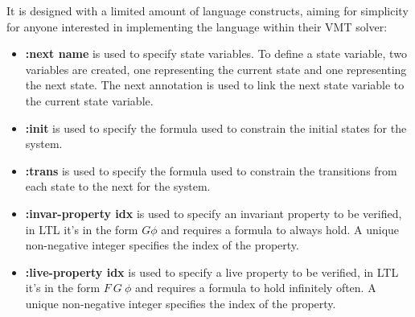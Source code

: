 It is designed with a limited amount of language constructs, aiming for simplicity for anyone interested in implementing the language within their VMT solver:
\begin{itemize}[noitemsep]
    \item \textbf{:next name} is used to specify state variables. To define a state variable, two variables are created, one representing the current state and one representing the next state. The next annotation is used to link the next state variable to the current state variable.
    \item \textbf{:init} is used to specify the formula used to constrain the initial states for the system.
    \item \textbf{:trans} is used to specify the formula used to constrain the transitions from each state to the next for the system.
    \item \textbf{:invar-property idx} is used to specify an invariant property to be verified, in LTL it's in the form \begin{math} G \phi \end{math} and requires a formula to always hold.  A unique non-negative integer specifies the index of the property.
    \item \textbf{:live-property idx} is used to specify a live property to be verified, in LTL it's in the form \begin{math} F\ G\ \phi\end{math} and requires a formula to hold infinitely often. A unique non-negative integer specifies the index of the property.
\end{itemize}
\cite{vmt-lib-paper} %


